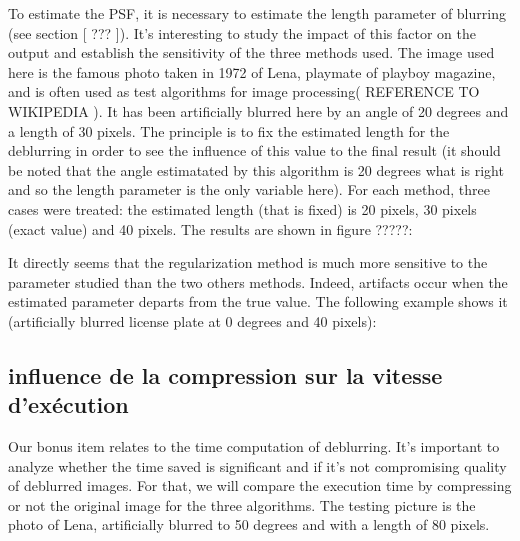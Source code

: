 To estimate the PSF, it is necessary to estimate the length parameter of blurring (see section [ ??? ]). It's interesting to study the impact of this factor on the output and establish the sensitivity of the three methods used.
The image used here is the famous photo taken in 1972 of Lena, playmate of playboy magazine, and is often used as test algorithms for image processing( REFERENCE TO WIKIPEDIA ). It has been artificially blurred here by an angle of 20 degrees and a length of 30 pixels. The principle is to fix the estimated length for the deblurring in order to see the influence of this value to the final result (it should be noted that the angle estimatated by this algorithm is 20 degrees what is right and so the length parameter is the only variable here). For each method, three cases were treated: the estimated length (that is fixed) is 20 pixels, 30 pixels (exact value) and 40 pixels.  The results are shown in figure ?????:


It directly seems that the regularization method is much more sensitive to the parameter studied than the two others methods. Indeed, artifacts occur when the estimated parameter departs from the true value. The following example shows it (artificially blurred license plate at 0 degrees and 40 pixels):



\subsection{influence de la compression sur la vitesse d'exécution}


Our bonus item relates to the time computation of deblurring. It's important to analyze whether the time saved is significant and if it's not compromising quality of deblurred images. For that, we will compare the execution time by compressing or not the original image for the three algorithms. The testing picture is the photo of Lena, artificially blurred to 50 degrees and with a length of 80 pixels.

